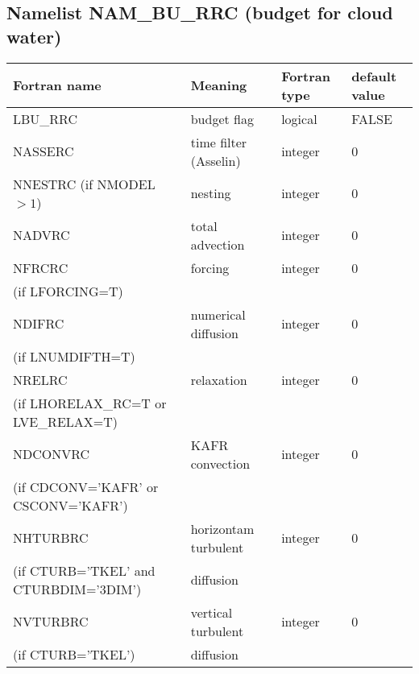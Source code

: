 
\subsection{Namelist NAM\_BU\_RRC (budget for cloud water)}

\begin{center}
\begin{tabular} {|p{8cm}|p{4cm}|>{\centering}p{1.5cm}|p{1.5cm}<{\centering}|}
\hline
Fortran name & Meaning & Fortran type & default value \\
\hline \hline
LBU\_RRC & budget flag & logical & FALSE\index{LBU\_RRC!\innam{NAM\_BU\_RRC}} \\\hline
NASSERC  & time filter (Asselin)   & integer  &  0 \index{NASSERC!\innam{NAM\_BU\_RRC}} \\\hline
NNESTRC (if NMODEL$>1$) & nesting           & integer  &  0 \index{NNESTRC!\innam{NAM\_BU\_RRC}} \\\hline
NADVRC   & total advection   & integer  &  0 \index{NADVRC!\innam{NAM\_BU\_RTH}}\\\hline
NFRCRC   & forcing           & integer  &  0 \index{NFRCRC!\innam{NAM\_BU\_RRC}} \\
(if LFORCING=T) &  &   &   \\\hline
NDIFRC   & numerical diffusion & integer  &  0 \index{NDIFRC!\innam{NAM\_BU\_RRC}}\\
(if LNUMDIFTH=T) &  &   &   \\\hline
NRELRC   & relaxation        & integer  &  0 \index{NRELRC!\innam{NAM\_BU\_RRC}}\\
(if LHORELAX\_RC=T or LVE\_RELAX=T) &  &   &   \\\hline
NDCONVRC & KAFR convection   & integer  &  0 \index{NDCONVRC!\innam{NAM\_BU\_RRC}} \\
(if CDCONV='KAFR' or CSCONV='KAFR') &  &   &   \\\hline
NHTURBRC & horizontam turbulent  & integer  &  0 \index{NHTURBRC!\innam{NAM\_BU\_RRC}}\\
(if CTURB='TKEL' and CTURBDIM='3DIM') &diffusion &   &  \\\hline
NVTURBRC & vertical turbulent  & integer  &  0 \index{NVTURBRC!\innam{NAM\_BU\_RRC}}\\
(if CTURB='TKEL') &diffusion &   &  \\\hline

\end{tabular}
\end{center}
